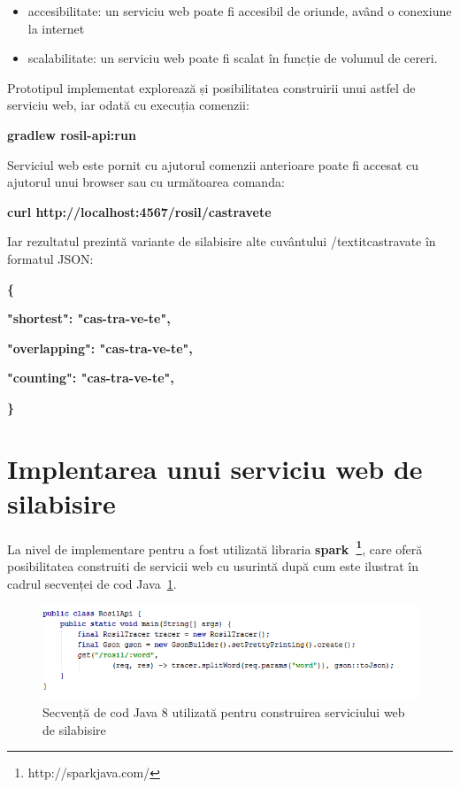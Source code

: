 \begin{itemize}
\item accesibilitate: un serviciu web poate fi accesibil de oriunde, având o conexiune la internet
\item scalabilitate: un serviciu web poate fi scalat în funcție de volumul de cereri. 
\end{itemize}

Prototipul implementat explorează și posibilitatea construirii unui astfel de serviciu web, iar odată cu execuția comenzii:

\begin{center}
\textbf{gradlew rosil-api:run}
\end{center}

Serviciul web este pornit cu ajutorul comenzii anterioare poate fi accesat cu ajutorul unui browser sau cu următoarea comanda:

\begin{center}
\textbf{curl http://localhost:4567/rosil/castravete}
\end{center}

Iar rezultatul prezintă variante de silabisire alte cuvântului /textit{castravate} în formatul JSON:


\textbf{\{}

\hspace{1cm}\textbf{"shortest": "cas-tra-ve-te",}

\hspace{1cm}\textbf{"overlapping": "cas-tra-ve-te",}

\hspace{1cm}\textbf{"counting": "cas-tra-ve-te",}
 
\textbf{\}}

\section{Implentarea unui serviciu web de silabisire}

La nivel de implementare pentru a fost utilizată libraria \textbf{spark~\footnote{http://sparkjava.com/}}, care oferă posibilitatea construiti de servicii web cu usurintă după cum este ilustrat în cadrul secvenței de cod Java~\ref{fig:rosil-api}.

\begin{figure}[h!]
    \centering
    \includegraphics[width=1.06\textwidth]{figures/rosil-api-code.png}
    \caption{Secvență de cod Java 8 utilizată pentru construirea serviciului web de silabisire}
    \label{fig:rosil-api}
\end{figure}

